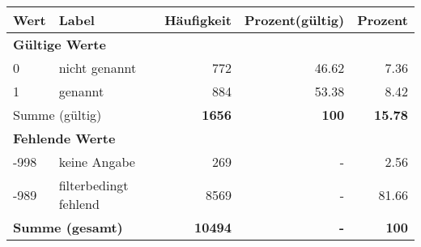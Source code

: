      \begin{longtable}{lXrrr}
     \toprule
     \textbf{Wert} & \textbf{Label} & \textbf{Häufigkeit} & \textbf{Prozent(gültig)} & \textbf{Prozent} \\
     \endhead
     \midrule
     \multicolumn{5}{l}{\textbf{Gültige Werte}}\\

     0 &
     \multicolumn{1}{X}{ nicht genannt   } &


       \num{772} &
       \num[round-mode=places,round-precision=2]{46,62} &
         \num[round-mode=places,round-precision=2]{7,36} \\

     1 &
     \multicolumn{1}{X}{ genannt   } &


       \num{884} &
       \num[round-mode=places,round-precision=2]{53,38} &
         \num[round-mode=places,round-precision=2]{8,42} \\
     \midrule
     \multicolumn{2}{l}{Summe (gültig)} &
       \textbf{\num{1656}} &
     \textbf{100} &
       \textbf{\num[round-mode=places,round-precision=2]{15,78}} \\
     \multicolumn{5}{l}{\textbf{Fehlende Werte}}\\
       -998 &
       keine Angabe &
         \num{269} &
        - &
         \num[round-mode=places,round-precision=2]{2,56} \\
       -989 &
       filterbedingt fehlend &
         \num{8569} &
        - &
         \num[round-mode=places,round-precision=2]{81,66} \\
     \midrule
     \multicolumn{2}{l}{\textbf{Summe (gesamt)}} &
          \textbf{\num{10494}} &
        \textbf{-} &
        \textbf{100} \\
     \bottomrule
     \end{longtable}
     
